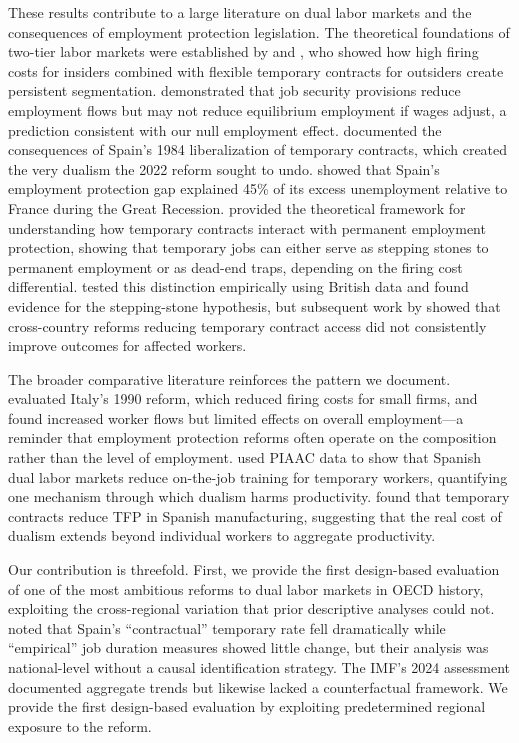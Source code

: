 \documentclass[12pt]{article}
\begin{document}
These results contribute to a large literature on dual labor markets and the consequences of employment protection legislation. The theoretical foundations of two-tier labor markets were established by \citet{blanchard1994large} and \citet{saint1996dual}, who showed how high firing costs for insiders combined with flexible temporary contracts for outsiders create persistent segmentation. \citet{lazear1990job} demonstrated that job security provisions reduce employment flows but may not reduce equilibrium employment if wages adjust, a prediction consistent with our null employment effect. \citet{dolado2002drawing} documented the consequences of Spain's 1984 liberalization of temporary contracts, which created the very dualism the 2022 reform sought to undo. \citet{bentolila2012two} showed that Spain's employment protection gap explained 45\% of its excess unemployment relative to France during the Great Recession. \citet{cahuc2002temporary} provided the theoretical framework for understanding how temporary contracts interact with permanent employment protection, showing that temporary jobs can either serve as stepping stones to permanent employment or as dead-end traps, depending on the firing cost differential. \citet{booth2002temporary} tested this distinction empirically using British data and found evidence for the stepping-stone hypothesis, but subsequent work by \citet{kahn2010employment} showed that cross-country reforms reducing temporary contract access did not consistently improve outcomes for affected workers.

The broader comparative literature reinforces the pattern we document. \citet{kugler2007employment} evaluated Italy's 1990 reform, which reduced firing costs for small firms, and found increased worker flows but limited effects on overall employment---a reminder that employment protection reforms often operate on the composition rather than the level of employment. \citet{cabrales2017dual} used PIAAC data to show that Spanish dual labor markets reduce on-the-job training for temporary workers, quantifying one mechanism through which dualism harms productivity. \citet{centeno2009temporary} found that temporary contracts reduce TFP in Spanish manufacturing, suggesting that the real cost of dualism extends beyond individual workers to aggregate productivity.

Our contribution is threefold. First, we provide the first design-based evaluation of one of the most ambitious reforms to dual labor markets in OECD history, exploiting the cross-regional variation that prior descriptive analyses could not. \citet{garcia2023reforming} noted that Spain's ``contractual'' temporary rate fell dramatically while ``empirical'' job duration measures showed little change, but their analysis was national-level without a causal identification strategy. The IMF's 2024 assessment \citep{imf2024spain} documented aggregate trends but likewise lacked a counterfactual framework. We provide the first design-based evaluation by exploiting predetermined regional exposure to the reform.
\end{document}
